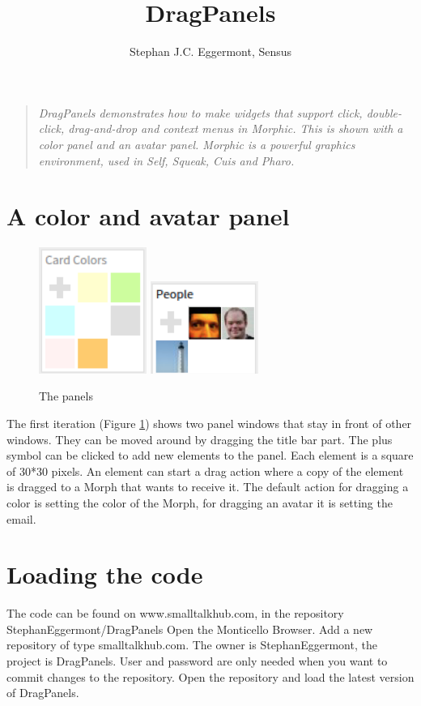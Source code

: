 \documentclass[10pt, twoside]{article}   	%
\title{DragPanels}
\author{Stephan J.C. Eggermont, Sensus}
\begin{document}
\setlength{\parindent}{0pt}
\maketitle
\begin{quote}
\em
DragPanels demonstrates how to make widgets that support click, double-click, drag-and-drop
and context menus in Morphic. This is shown with a color panel and an avatar panel.
Morphic is a powerful graphics environment, used in Self, Squeak, Cuis and Pharo.
\end{quote} 
\section{A color and avatar panel}
\begin{figure}[htb]
\begin{center}
\includegraphics[width=100pt]{CardColors.png}
\includegraphics[width=100pt]{Avatars.png}
\caption{The panels}
\label{1stIteration}
\end{center}
\end{figure}
The first iteration (Figure \ref{1stIteration})  shows two panel windows that
stay in front of other windows. They can be moved around  by dragging
the title bar part. The plus symbol can be clicked to add new elements
to the panel. Each element is a square of 30*30 pixels. An element can 
start a drag action where a copy of the element is dragged to a Morph that
wants to receive it. The default action for dragging a color is setting the color
of the Morph, for dragging an avatar it is setting the email.


\section{Loading the code}
The code can be found on www.smalltalkhub.com, in the repository StephanEggermont/DragPanels
Open the Monticello Browser. Add a new repository of type smalltalkhub.com. 
The owner is StephanEggermont, the project is DragPanels. User and password are only needed
when you want to commit changes to the repository. Open the repository and load the latest version of
DragPanels.
\end{document}
